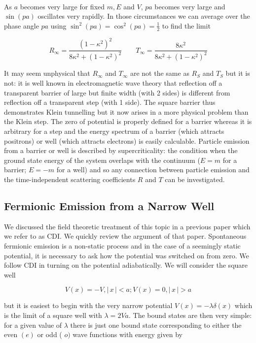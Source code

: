 \smallskip\ 

\noindent As $a$ becomes very large for fixed $m,E$ and $V$, $pa$ becomes
very large and $\sin (pa)$ oscillates very rapidly. In those circumstances
we can average over the phase angle $pa$ using $\sin ^2(pa)=\cos ^2(pa)=%
\frac 12$ to find the limit

\begin{equation}  \label{inf}
R_\infty =\frac{(1-\kappa ^2)^2}{8\kappa ^2+(1-\kappa ^2)^2}\qquad T_\infty =%
\frac{8\kappa ^2}{8\kappa ^2+(1-\kappa ^2)^2}
\end{equation}

\noindent It may seem unphysical that $R_\infty $ and $T_\infty $ are not
the same as $R_S$ and $T_S$ but it is not: it is well known in
electromagnetic wave theory \cite{stratton} that reflection off a
transparent barrier of large but finite width (with 2 sides) is different
from reflection off a transparent step (with 1 side). The square barrier
thus demonstrates Klein tunnelling but it now arises in a more physical
problem than the Klein step. The zero of potential is properly defined for a
barrier whereas it is arbitrary for a step and the energy spectrum of a
barrier (which attracts positrons) or well (which attracts electrons) is
easily calculable. Particle emission from a barrier or well is described by
supercriticality: the condition when the ground state energy of the system
overlaps with the continuum ($E=m$ for a barrier; $E=-m$ for a well) and so
any connection between particle emission and the time-independent scattering
coefficients $R$ and $T$ can be investigated.

\subsection{Fermionic Emission from a Narrow Well}

\noindent We discussed the field theoretic treatment of this topic in a
previous paper \cite{cdi} which we refer to as CDI. We quickly review the
argument of that paper. Spontaneous fermionic emission is a non-static
process and in the case of a seemingly static potential, it is necessary to
ask how the potential was switched on from zero. We follow CDI in turning on
the potential adiabatically. We will consider the square well

\begin{equation}
V(x)=-V,|\,x\,|<a;V(x)=0,|\,x\,|>a  \label{well}
\end{equation}

\noindent but it is easiest to begin with the very narrow potential $%
V(x)=-\lambda \delta (x)$ which is the limit of a square well with $\lambda
=2Va$. The bound states are then very simple: for a given value of $\lambda $
there is just one bound state corresponding to either the even $(e)$ or odd (%
$o)$ wave functions \cite{cdi} with energy given by

